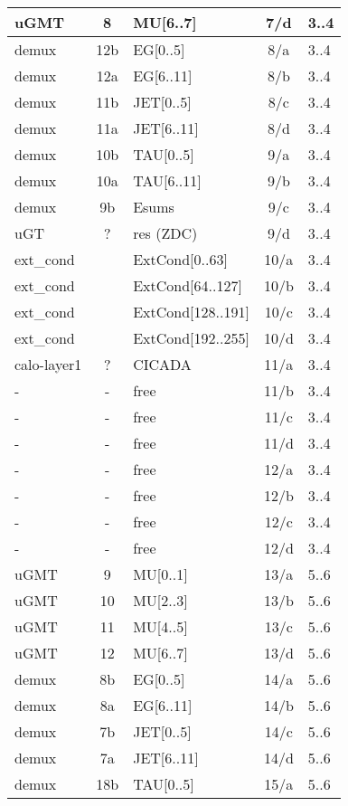 \begin{longtable}{|l|c|l|c|l|}
uGMT  & 8   & MU[6..7]   & 7/d  & 3..4 \\\hline
demux & 12b & EG[0..5]   & 8/a  & 3..4 \\\hline
demux & 12a & EG[6..11]  & 8/b  & 3..4 \\\hline
demux & 11b & JET[0..5]  & 8/c  & 3..4 \\\hline
demux & 11a & JET[6..11] & 8/d  & 3..4 \\\hline
demux & 10b & TAU[0..5]  & 9/a  & 3..4 \\\hline
demux & 10a & TAU[6..11] & 9/b  & 3..4 \\\hline
demux & 9b  & Esums      & 9/c  & 3..4 \\\hline
uGT   & ?   & res (ZDC)  & 9/d  & 3..4 \\\hline
ext\_cond &     & ExtCond[0..63]    & 10/a & 3..4 \\\hline
ext\_cond &     & ExtCond[64..127]  & 10/b & 3..4 \\\hline
ext\_cond &     & ExtCond[128..191] & 10/c & 3..4 \\\hline
ext\_cond &     & ExtCond[192..255] & 10/d & 3..4 \\\hline
calo-layer1 & ? & CICADA & 11/a & 3..4 \\\hline
- & - & free & 11/b & 3..4 \\\hline
- & - & free & 11/c & 3..4 \\\hline
- & - & free & 11/d & 3..4 \\\hline
- & - & free & 12/a & 3..4 \\\hline
- & - & free & 12/b & 3..4 \\\hline
- & - & free & 12/c & 3..4 \\\hline
- & - & free & 12/d & 3..4 \\\hline
\hline
uGMT  & 9   & MU[0..1]   & 13/a & 5..6 \\\hline
uGMT  & 10  & MU[2..3]   & 13/b & 5..6 \\\hline
uGMT  & 11  & MU[4..5]   & 13/c & 5..6 \\\hline
uGMT  & 12  & MU[6..7]   & 13/d & 5..6 \\\hline
demux & 8b  & EG[0..5]   & 14/a & 5..6 \\\hline
demux & 8a  & EG[6..11]  & 14/b & 5..6 \\\hline
demux & 7b  & JET[0..5]  & 14/c & 5..6 \\\hline
demux & 7a  & JET[6..11] & 14/d & 5..6 \\\hline
demux & 18b & TAU[0..5]  & 15/a & 5..6 \\\hline

\end{longtable}
